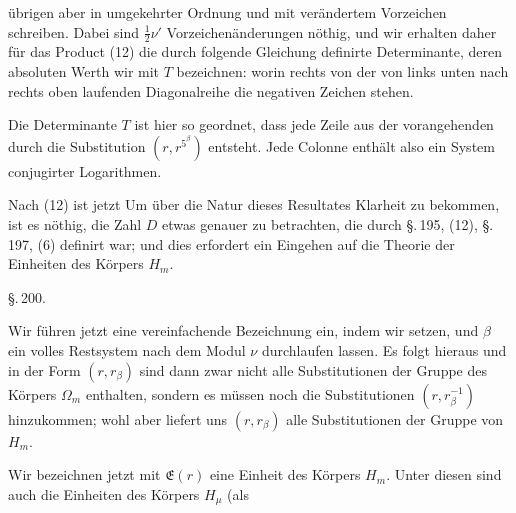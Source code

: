 übrigen aber in umgekehrter Ordnung und mit verändertem Vorzeichen schreiben.
Dabei sind $\frac{1}{2}\nu'$ Vorzeichenänderungen nöthig,
und wir erhalten daher für das Product (12) die durch folgende
Gleichung definirte Determinante, deren absoluten Werth wir
mit $T$ bezeichnen:
worin rechts von der von links unten nach rechts oben laufenden
Diagonalreihe die negativen Zeichen stehen.

Die Determinante $T$ ist hier so geordnet, dass jede Zeile
aus der vorangehenden durch die Substitution $(r, r^{5^\beta})$ entsteht.
Jede Colonne enthält also ein System conjugirter Logarithmen.

Nach (12) ist jetzt
Um über die Natur dieses Resultates Klarheit zu bekommen,
ist es nöthig, die Zahl $D$ etwas genauer zu betrachten, die durch
\S.\,195, (12), \S.\,197, (6) definirt war; und dies erfordert ein Eingehen
 auf die Theorie der Einheiten des Körpers $H_m$.

\begin{center}
\S.\,200.\\
\end{center}

Wir führen jetzt eine vereinfachende Bezeichnung ein, indem wir
setzen, und $\beta$ ein volles Restsystem nach dem Modul $\nu$ durchlaufen
 lassen. Es folgt hieraus
und in der Form $(r, r_\beta)$ sind dann zwar nicht alle Substitutionen
der Gruppe des Körpers $\Omega_m$ enthalten, sondern es müssen noch
die Substitutionen $(r, r_\beta^{-1})$ hinzukommen; wohl aber liefert uns
$(r, r_\beta)$ alle Substitutionen der Gruppe von $H_m$.

Wir bezeichnen jetzt mit $\mathfrak{E}(r)$ eine Einheit des Körpers $H_m$.
Unter diesen sind auch die Einheiten des Körpers $H_\mu$ (als
